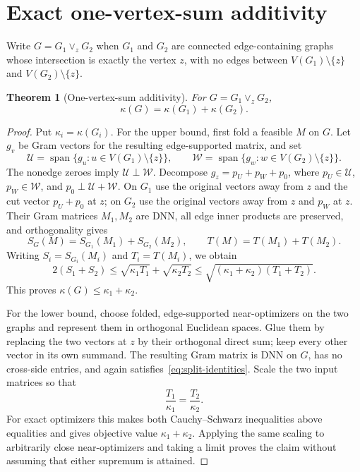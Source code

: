 \documentclass[11pt]{article}
\newtheorem{theorem}{Theorem}[section]
\theoremstyle{remark}
\begin{document}
\section{Exact one-vertex-sum additivity}

Write $G=G_1\vee_zG_2$ when $G_1$ and $G_2$ are connected edge-containing
graphs whose intersection is exactly the vertex $z$, with no edges between
$V(G_1)\setminus\{z\}$ and $V(G_2)\setminus\{z\}$.

\begin{theorem}[One-vertex-sum additivity]\label{thm:additivity}
For $G=G_1\vee_zG_2$,
\[
 \kappa(G)=\kappa(G_1)+\kappa(G_2).
\]
\end{theorem}

\begin{proof}
Put $\kappa_i=\kappa(G_i)$.  For the upper bound, first fold a feasible $M$
on $G$.  Let $g_v$ be Gram vectors for the resulting edge-supported matrix,
and set
\[
 \mathcal U=\operatorname{span}\{g_u:u\in V(G_1)\setminus\{z\}\},
 \qquad
 \mathcal W=\operatorname{span}\{g_w:w\in V(G_2)\setminus\{z\}\}.
\]
The nonedge zeroes imply $\mathcal U\perp\mathcal W$.  Decompose
$g_z=p_U+p_W+p_0$, where $p_U\in\mathcal U$, $p_W\in\mathcal W$, and
$p_0\perp\mathcal U+\mathcal W$.  On $G_1$ use the original vectors away
from $z$ and the cut vector $p_U+p_0$ at $z$; on $G_2$ use the original
vectors away from $z$ and $p_W$ at $z$.  Their Gram matrices $M_1,M_2$ are
DNN, all edge inner products are preserved, and orthogonality gives
\begin{equation}\label{eq:split-identities}
 S_G(M)=S_{G_1}(M_1)+S_{G_2}(M_2),
 \qquad T(M)=T(M_1)+T(M_2).
\end{equation}
Writing $S_i=S_{G_i}(M_i)$ and $T_i=T(M_i)$, we obtain
\[
 2(S_1+S_2)
 \leq\sqrt{\kappa_1T_1}+\sqrt{\kappa_2T_2}
 \leq\sqrt{(\kappa_1+\kappa_2)(T_1+T_2)}.
\]
This proves $\kappa(G)\leq\kappa_1+\kappa_2$.

For the lower bound, choose folded, edge-supported near-optimizers on the two
graphs and represent them in orthogonal Euclidean spaces.  Glue them by
replacing the two vectors at $z$ by their orthogonal direct sum; keep every
other vector in its own summand.  The resulting Gram matrix is DNN on $G$,
has no cross-side entries, and again satisfies~\eqref{eq:split-identities}.
Scale the two input matrices so that
\begin{equation}\label{eq:correct-scaling}
 \frac{T_1}{\kappa_1}=\frac{T_2}{\kappa_2}.
\end{equation}
For exact optimizers this makes both Cauchy--Schwarz inequalities above
equalities and gives objective value $\kappa_1+\kappa_2$.  Applying the same
scaling to arbitrarily close near-optimizers and taking a limit proves the
claim without assuming that either supremum is attained.
\end{proof}
\end{document}
